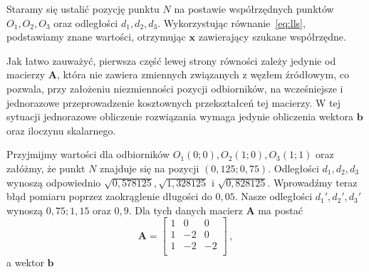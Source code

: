 Staramy się ustalić pozycję punktu $N$ na postawie współrzędnych punktów $O_1, O_2, O_3$ oraz odległości $d_1, d_2, d_3$. Wykorzystując równanie~\ref{eq:lls}, podstawiamy znane wartości, otrzymując $\mathbf{x}$ zawierający szukane współrzędne. 

Jak łatwo zauważyć, pierwsza część lewej strony równości zależy jedynie od macierzy $\mathbf{A}$, która nie zawiera zmiennych związanych z węzłem źródłowym, co pozwala, przy założeniu niezmienności pozycji odbiorników, na wcześniejsze i jednorazowe przeprowadzenie kosztownych przekształceń tej macierzy. W tej sytuacji jednorazowe obliczenie rozwiązania wymaga jedynie obliczenia wektora $\mathbf{b}$ oraz iloczynu skalarnego.

Przyjmijmy wartości dla odbiorników $O_1(0;0), O_2(1;0), O_3(1;1)$ oraz załóżmy, że punkt $N$ znajduje się na pozycji $\left(0,125;0,75\right)$. Odległości $d_1, d_2, d_3$ wynoszą odpowiednio $\sqrt{0,578125}, \sqrt{1,328125}$ i $\sqrt{0,828125}$. Wprowadźmy teraz błąd pomiaru poprzez zaokrąglenie długości do $0,05$. Nasze odległości $d_1', d_2', d_3'$ wynoszą $0,75; 1,15$ oraz $0,9$. Dla tych danych macierz $\mathbf{A}$ ma postać
\begin{equation*}
    \mathbf{A} =
    \left[
        \begin{matrix}
            1 & 0 & 0\\
            1 & -2 & 0\\
            1 & -2 & -2\\
        \end{matrix}
    \right]\,,
\end{equation*}
a wektor $\mathbf{b}$

